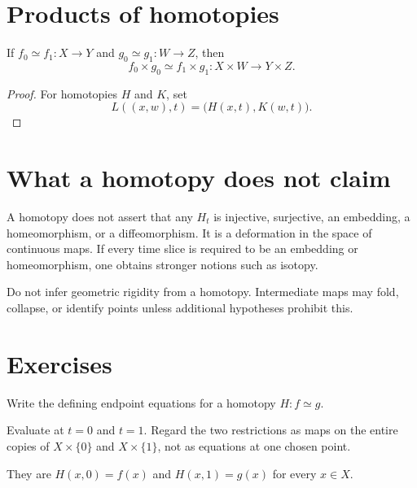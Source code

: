 \section{Products of homotopies}

\begin{proposition}
\label{prop:viii01-product}
If \(f_0\simeq f_1:X\to Y\) and \(g_0\simeq g_1:W\to Z\), then
\[
f_0\times g_0\simeq f_1\times g_1:X\times W\to Y\times Z.
\]
\end{proposition}

\begin{proof}
For homotopies \(H\) and \(K\), set
\[
L((x,w),t)=\bigl(H(x,t),K(w,t)\bigr).
\]
\end{proof}

\section{What a homotopy does not claim}

A homotopy does not assert that any \(H_t\) is injective, surjective, an
embedding, a homeomorphism, or a diffeomorphism.  It is a deformation in the
space of continuous maps.  If every time slice is required to be an embedding
or homeomorphism, one obtains stronger notions such as isotopy.

\begin{warning}
\label{warn:viii01-isotopy}
Do not infer geometric rigidity from a homotopy.  Intermediate maps may fold,
collapse, or identify points unless additional hypotheses prohibit this.
\end{warning}

\section{Exercises}

\begin{exercise}\label{exr:viii01-01}
Write the defining endpoint equations for a homotopy \(H:f\simeq g\).
\end{exercise}
\begin{hint}Evaluate at \(t=0\) and \(t=1\).
Regard the two restrictions as maps on the entire copies of \(X\times\{0\}\) and \(X\times\{1\}\), not as equations at one chosen point.
\end{hint}
\begin{solution}
They are \(H(x,0)=f(x)\) and \(H(x,1)=g(x)\) for every \(x\in X\).
\end{solution}

